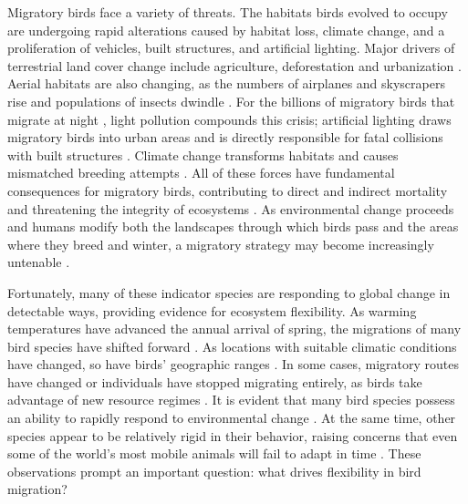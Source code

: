 \documentclass[a4paper, nobind]{templates/ociamthesis}
\begin{document}
Migratory birds face a variety of threats. The habitats birds evolved to occupy are undergoing rapid alterations caused by habitat loss, climate change, and a proliferation of vehicles, built structures, and artificial lighting. Major drivers of terrestrial land cover change include agriculture, deforestation and urbanization \autocite{lambinCausesLanduseLandcover2001}. Aerial habitats are also changing, as the numbers of airplanes and skyscrapers rise and populations of insects dwindle \autocite{hallmannMore75Percent2017,diehlExtendingHabitatConcept2017,stepanianDeclinesAbundantAquatic2020}. For the billions of migratory birds that migrate at night \autocite{newtonMigrationEcologyBirds2008}, light pollution compounds this crisis; artificial lighting draws migratory birds into urban areas and is directly responsible for fatal collisions with built structures \autocite{allenDestructionBirdsLighthouses1880,lossDirectMortalityBirds2015,mclarenArtificialLightNight2018,laoInfluenceArtificialLight2020}. Climate change transforms habitats and causes mismatched breeding attempts \autocite{dunnEffectsClimateChange2019}. All of these forces have fundamental consequences for migratory birds, contributing to direct and indirect mortality and threatening the integrity of ecosystems \autocite{kirbyKeyConservationIssues2008}. As environmental change proceeds and humans modify both the landscapes through which birds pass and the areas where they breed and winter, a migratory strategy may become increasingly untenable \autocite{wilcoveGoingGoingGone2008,rungeProtectedAreasGlobal2015}.

Fortunately, many of these indicator species are responding to global change in detectable ways, providing evidence for ecosystem flexibility. As warming temperatures have advanced the annual arrival of spring, the migrations of many bird species have shifted forward \autocite{usuiTemporalShiftsTemperature2017}. As locations with suitable climatic conditions have changed, so have birds' geographic ranges \autocite{lasortePolewardShiftsWinter2007,devictorBirdsAreTracking2008,tingleyPushPullClimate2012}. In some cases, migratory routes have changed or individuals have stopped migrating entirely, as birds take advantage of new resource regimes \autocite{visserClimateChangeLeads2009,elmbergInterpretingSeasonalRange2014,chengCloserHomeStrategy2019}. It is evident that many bird species possess an ability to rapidly respond to environmental change \autocite{usuiTemporalShiftsTemperature2017}. At the same time, other species appear to be relatively rigid in their behavior, raising concerns that even some of the world's most mobile animals will fail to adapt in time \autocite{sutherlandEvidenceFlexibilityConstraint1998,bothAdjustmentClimateChange2001,crickImpactClimateChange2004}. These observations prompt an important question: what drives flexibility in bird migration?
\end{document}

